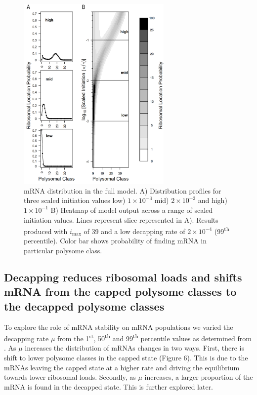 \documentclass[a4,center,fleqn]{NAR}
\newcommand{\imax}{\ensuremath{{i_{\max}}}\xspace}
\begin{document}
\begin{figure}[!ht]
\begin{center}
\includegraphics[width=75mm]{Images/2023-07-09_Figure1_DIIvsDDI_medianlength_low_marking_with_labels.png}
\caption{mRNA distribution in the full model. A) Distribution profiles for three scaled initiation values low) $1\times 10^{-3}$ mid) $2\times 10^{-2}$ and high) $1\times 10^{-1}$ B) Heatmap of model output across a range of scaled initiation values. Lines represent slice represented in A). Results produced with \imax of 39 and a low decapping rate of $2\times10^{-4}$  (99\textsuperscript{th} percentile). Color bar shows probability of finding mRNA in particular polysome class.}
\end{center}
\end{figure}


\subsection{Decapping reduces ribosomal loads and shifts mRNA from the capped polysome classes to the decapped polysome classes}

To explore the role of mRNA stability on mRNA populations we varied the decapping rate $\mu$ from the 1\textsuperscript{st}, 50\textsuperscript{th} and 99\textsuperscript{th} percentile values as determined from  \citep{RN27}.
As $\mu$ increases the distribution of mRNAs changes in two ways. 
First, there is shift to lower polysome classes in the capped state (Figure 6).
This is due to the mRNAs leaving the capped state at a higher rate and driving the equilibrium towards lower ribosomal loads. 
Secondly, as $\mu$ increases, a larger proportion of the mRNA is found in the decapped state. This is further explored later. 
\end{document}
